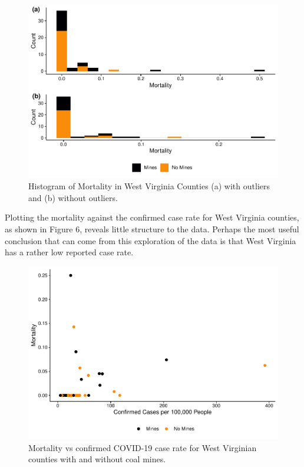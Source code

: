\documentclass[
  12pt,
]{article}
\begin{document}
\begin{figure}
\centering
\includegraphics{Hancock_ENV872_Project_files/figure-latex/WV Histograms-1.pdf}
\caption{Histogram of Mortality in West Virginia Counties (a) with
outliers and (b) without outliers.}
\end{figure}

Plotting the mortality against the confirmed case rate for West Virginia
counties, as shown in Figure 6, reveals little structure to the data.
Perhaps the most useful conclusion that can come from this exploration
of the data is that West Virginia has a rather low reported case rate.

\begin{figure}
\centering
\includegraphics{Hancock_ENV872_Project_files/figure-latex/WV Mortality vs Case Rate-1.pdf}
\caption{Mortality vs confirmed COVID-19 case rate for West Virginian
counties with and without coal mines.}
\end{figure}
\end{document}
